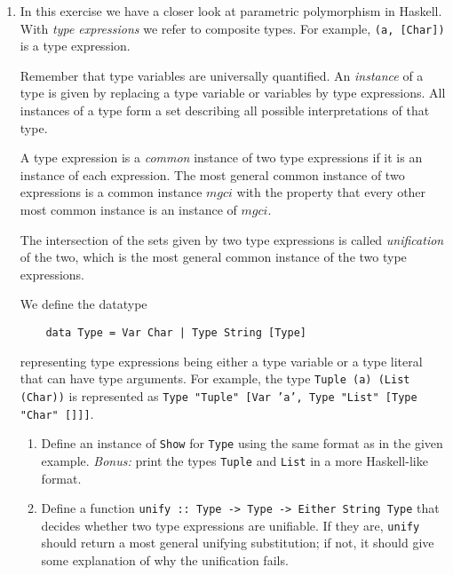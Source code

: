 \documentclass{article}
\def\code#1{\texttt{#1}}
\begin{document}
\begin{enumerate}
    \item \cite[p. 314]{thompson} In this exercise we have a closer look at parametric polymorphism in Haskell. With \textit{type expressions} we refer to composite types. For example, \code{(a, [Char])} is a type expression. \par
        Remember that type variables are universally quantified. An \textit{instance} of a type is given by replacing a type variable or variables by type expressions. All instances of a type form a set describing all possible interpretations of that type. \par
        A type expression is a \textit{common} instance of two type expressions if it is an instance of each expression. The most general common instance of two expressions is a common instance $mgci$ with the property that every other most common instance is an instance of $mgci$. \par
        The intersection of the sets given by two type expressions is called \textit{unification} of the two, which is the most general common instance of the two type expressions. \par
        We define the datatype
        \begin{verbatim}
    data Type = Var Char | Type String [Type]
        \end{verbatim}
        representing type expressions being either a type variable or a type literal that can have type arguments. For example, the type \code{Tuple (a) (List (Char))} is represented as \code{Type "Tuple" [Var 'a', Type "List" [Type "Char" []]]}.
        \begin{enumerate}
            \item Define an instance of \code{Show} for \code{Type} using the same format as in the given example. \textit{Bonus:} print the types \code{Tuple} and \code{List} in a more Haskell-like format.
            \item Define a function \code{unify :: Type -> Type -> Either String Type} that decides whether two type expressions are unifiable. If they are, \code{unify} should return a most general unifying substitution; if not, it should give some explanation of why the unification fails.
        \end{enumerate}


\end{enumerate}
\end{document}
